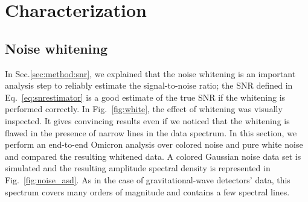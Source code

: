 \section{Characterization} \label{sec:characterization}

\subsection{Noise whitening} \label{sec:characterization:whitening}
In Sec.\ref{sec:method:snr}, we explained that the noise whitening is an important analysis step to reliably estimate the signal-to-noise ratio; the SNR defined in Eq.~\ref{eq:snrestimator} is a good estimate of the true SNR if the whitening is performed correctly. In Fig.~\ref{fig:white}, the effect of whitening was visually inspected. It gives convincing results even if we noticed that the whitening is flawed in the presence of narrow lines in the data spectrum. In this section, we perform an end-to-end Omicron analysis over colored noise and pure white noise and compared the resulting whitened data. A colored Gaussian noise data set is simulated and the resulting amplitude spectral density is represented in Fig.~\ref{fig:noise_asd}. As in the case of gravitational-wave detectors' data, this spectrum covers many orders of magnitude and contains a few spectral lines.


